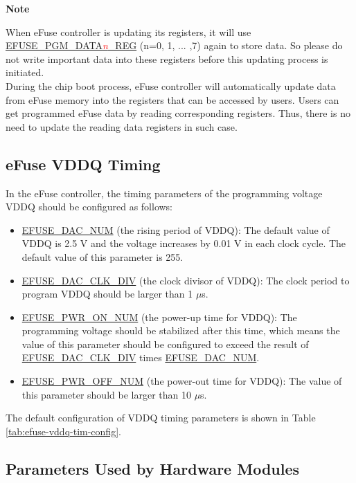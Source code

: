 \documentclass[main\_\_EN.tex]{subfiles}
\begin{document}
{\bfseries Note}

When eFuse controller is updating its registers, it will use \hyperref[regdesc:EFUSEPGMDATANREG]{EFUSE\_PGM\_DATA\textcolor{red}{\it{n}}\_REG} (n=0, 1, ... ,7) again to store data. So please do not write important data into these registers before this updating process is initiated. \\
During the chip boot process, eFuse controller will automatically update data from eFuse memory into the registers that can be accessed by users. Users can get programmed eFuse data by reading corresponding registers. Thus, there is no need to update the reading data registers in such case.

\subsection{eFuse VDDQ Timing}
\label{sec:efuse-vddq-timing}

In the eFuse controller, the timing parameters of the programming voltage VDDQ should be configured as follows:

\begin{itemize}
    \item \hyperref[fielddesc:EFUSEDACNUM]{EFUSE\_DAC\_NUM} (the rising period of VDDQ): The default value of VDDQ is 2.5 V and the voltage increases by 0.01 V in each clock cycle. The default value of this parameter is 255.
    \item \hyperref[fielddesc:EFUSEDACCLKDIV]{EFUSE\_DAC\_CLK\_DIV} (the clock divisor of VDDQ): The clock period to program VDDQ should be larger than 1 $\mu$s.
    \item \hyperref[fielddesc:EFUSEPWRONNUM]{EFUSE\_PWR\_ON\_NUM} (the power-up time for VDDQ): The programming voltage should be stabilized after this time, which means the value of this parameter should be configured to exceed the result of \hyperref[fielddesc:EFUSEDACCLKDIV]{EFUSE\_DAC\_CLK\_DIV} times \hyperref[fielddesc:EFUSEDACNUM]{EFUSE\_DAC\_NUM}.
    \item \hyperref[fielddesc:EFUSEPWROFFNUM]{EFUSE\_PWR\_OFF\_NUM} (the power-out time for VDDQ): The value of this parameter should be larger than 10 $\mu$s.
\end{itemize}

The default configuration of VDDQ timing parameters is shown in Table \ref{tab:efuse-vddq-tim-config}.



\subsection{Parameters Used by Hardware Modules}
\end{document}
